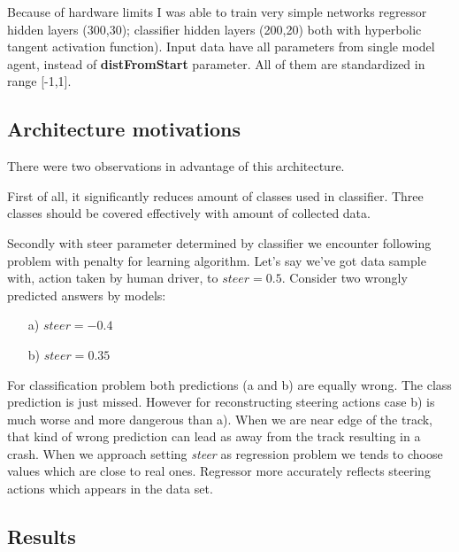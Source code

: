 \documentclass[declaration,shortabstract,english,inz]{iithesis}
\begin{document}
Because of hardware limits I was able to train very simple networks regressor hidden layers (300,30); classifier hidden layers (200,20) both with hyperbolic tangent activation function). Input data have all parameters from single model agent, instead of \textbf{distFromStart} parameter. All of them are standardized in range [-1,1].

\subsection{Architecture motivations}

There were two observations in advantage of this architecture. 

First of all, it significantly reduces amount of classes used in classifier. Three classes should be covered effectively with amount of collected data.

Secondly with steer parameter determined by classifier we encounter following problem with penalty for learning algorithm. Let's say we've got data sample with, action taken by human driver, to $steer=0.5$. Consider two wrongly predicted answers by models:
\begin{itemize}
    \item[a)] $steer=-0.4$
    \item[b)] $steer=0.35$
\end{itemize}

For classification problem both predictions (a and b) are equally wrong.  The class prediction is just missed. However for reconstructing steering actions case b) is much worse and more dangerous than a). When we are near edge of the track, that kind of wrong prediction can lead as away from the track resulting in a crash. When we approach setting \textit{steer} as regression problem we tends to choose values which are close to real ones. Regressor more accurately reflects steering actions which appears in the data set.

\subsection{Results}
\end{document}
